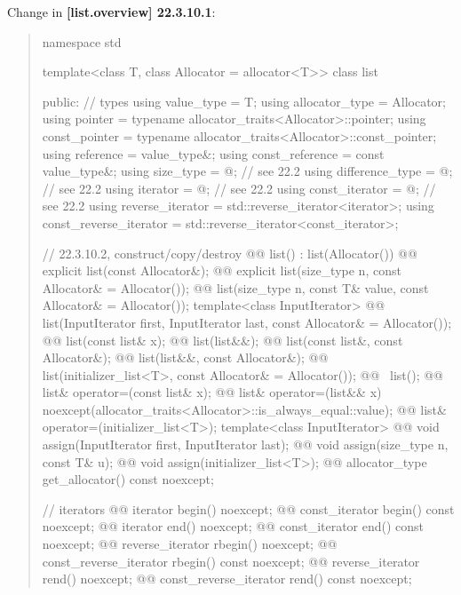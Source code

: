 \documentclass{wg21}
\begin{document}
Change in \textbf{[list.overview] 22.3.10.1}:
\begin{quote}
\begin{codeblock}
namespace std {
  template<class T, class Allocator = allocator<T>>
  class list {
  public:
    // types
    using value_type             = T;
    using allocator_type         = Allocator;
    using pointer                = typename allocator_traits<Allocator>::pointer;
    using const_pointer          = typename allocator_traits<Allocator>::const_pointer;
    using reference              = value_type&;
    using const_reference        = const value_type&;
    using size_type              = @\impdef@; // see 22.2
    using difference_type        = @\impdef@; // see 22.2
    using iterator               = @\impdef@; // see 22.2
    using const_iterator         = @\impdef@; // see 22.2
    using reverse_iterator       = std::reverse_iterator<iterator>;
    using const_reverse_iterator = std::reverse_iterator<const_iterator>;

    // 22.3.10.2, construct/copy/destroy
    @@ list() : list(Allocator()) { }
    @@ explicit list(const Allocator&);
    @@ explicit list(size_type n, const Allocator& = Allocator());
    @@ list(size_type n, const T& value, const Allocator& = Allocator());
    template<class InputIterator>
      @@ list(InputIterator first, InputIterator last, const Allocator& = Allocator());
    @@ list(const list& x);
    @@ list(list&&);
    @@ list(const list&, const Allocator&);
    @@ list(list&&, const Allocator&);
    @@ list(initializer_list<T>, const Allocator& = Allocator());
    @@ ~list();
    @@ list& operator=(const list& x);
    @@ list& operator=(list&& x)
      noexcept(allocator_traits<Allocator>::is_always_equal::value);
    @@ list& operator=(initializer_list<T>);
    template<class InputIterator>
      @@ void assign(InputIterator first, InputIterator last);
    @@ void assign(size_type n, const T& u);
    @@ void assign(initializer_list<T>);
    @@ allocator_type get_allocator() const noexcept;

    // iterators
    @@ iterator               begin() noexcept;
    @@ const_iterator         begin() const noexcept;
    @@ iterator               end() noexcept;
    @@ const_iterator         end() const noexcept;
    @@ reverse_iterator       rbegin() noexcept;
    @@ const_reverse_iterator rbegin() const noexcept;
    @@ reverse_iterator       rend() noexcept;
    @@ const_reverse_iterator rend() const noexcept;

}}
\end{codeblock}
\end{quote}
\end{document}
